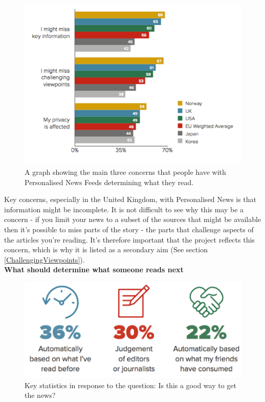 \documentclass[12pt]{article}
\begin{document}
\begin{figure}[h]
  \centering
    \includegraphics[scale=0.6]{PersonalisedNewsConcerns.png}
   \caption[Concerns with personalisation of News Feeds]{A graph showing the main three concerns that people have with Personalised News Feeds determining what they read.}
   \label{PersonalisedNewsConcerns}
\end{figure}

Key concerns, especially in the United Kingdom, with Personalised News is that information might be incomplete. It is not difficult to see why this may be a concern - if you limit your news to a subset of the sources that might be available then it's possible to miss parts of the story - the parts that challenge aspects of the articles you're reading. It's therefore important that the project reflects this concern, which is why it is listed as a secondary aim (See section \ref{ChallengingViewpoints}). \\

\textbf{What should determine what someone reads next}

\begin{figure}[h]
  \centering
    \includegraphics[scale=0.6]{HowPeopleTrustNews.png}
   \caption[What is a good way to get to the news?]{Key statistics in response to the question: Is this a good way to get the news?}
   \label{HowPeopleTrustNews}
\end{figure}
\end{document}
